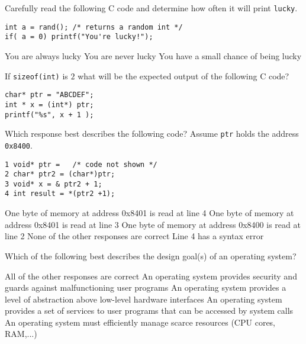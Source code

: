\variant
Carefully read the following C code and determine how often it will print {\tt lucky}.
\begin{verbatim}
int a = rand(); /* returns a random int */
if( a = 0) printf("You're lucky!");
\end{verbatim}
\begin{answers}
\answer You are always lucky
\correctanswer You are never lucky
\answer You have a small chance of being lucky
\end{answers}
\begin{solution}
\end{solution}


\variant
If {\tt sizeof(int)} is $2$ what will be the expected output of the following C code? 
\begin{verbatim}
char* ptr = "ABCDEF";
int * x = (int*) ptr;
printf("%s", x + 1 );
\end{verbatim}
\begin{answers}
\end{answers}
\begin{solution}
\end{solution}


\variant
Which response best describes the following code? Assume {\tt ptr} holds the address {\tt 0x8400}.
\begin{verbatim}
1 void* ptr =   /* code not shown */
2 char* ptr2 = (char*)ptr;
3 void* x = & ptr2 + 1;
4 int result = *(ptr2 +1);  
\end{verbatim}
\begin{answers}
\correctanswer  One byte of memory at address 0x8401 is read at line 4
\answer  One byte of memory at address 0x8401 is read at line 3
\answer  One byte of memory at address 0x8400 is read at line 2
\answer  None of the other responses are correct
\answer  Line 4 has a syntax error
\end{answers}
\begin{solution}
\end{solution}


\variant
Which of the following best describes the design goal(s) of an operating system?
\begin{answers}
\correctanswer  All of the other responses are correct
\answer  An operating system provides security and guards against malfunctioning user programs
\answer  An operating system provides a level of abstraction above low-level hardware interfaces
\answer  An operating system provides a set of services to user programs that can be accessed by system calls
\answer  An operating system must efficiently manage scarce resources (CPU cores, RAM,...)
\end{answers}
\begin{solution}
\end{solution}


